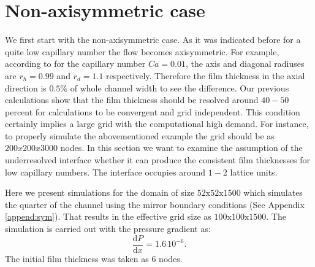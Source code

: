 \documentclass{article}
\begin{document}

\section{Non-axisymmetric case}
We first start with the non-axisymmetric case. As it was indicated before for a quite low capillary
number the flow becomes axisymmetric. For
example, according to \cite{heil-threedim} for the capillary
number $Ca=0.01$, the axis and diagonal radiuses are $r_h=0.99$ and $r_d=1.1$ respectively.
Therefore the film thickness in the axial direction is  $0.5\%$ of whole channel width to see the
difference. Our previous calculations \cite{kuzmin-binary2d} show that the film thickness should be
 resolved around $40-50$ percent for calculations to be convergent and grid independent. This
condition certainly implies a large grid with the computational high demand. For instance, to
properly simulate the abovementioned example the grid should be as 
$200x200x3000$ nodes. In this section we want to examine the assumption of the underresolved
interface whether it can produce the consistent film thicknesses for low capillary numbers. The
interface occupies around $1-2$ lattice units. 

Here we present simulations for the domain of size $52\mathrm{x}52\mathrm{x}1500$ which simulates
the quarter of the channel using the mirror boundary conditions (See Appendix \ref{append:sym}).
That
results in the effective grid size as $100\mathrm{x}100\mathrm{x}1500$. The simulation is carried
out with the pressure gradient as:
\begin{equation}
\frac{\mathrm{d}P}{\mathrm{d}x}=1.6\,10^{-6}.
\end{equation}
The initial film thickness was taken as $6$ nodes. 
\end{document}
